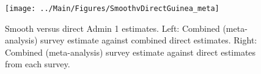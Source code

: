 \documentclass[12pt]{article}\usepackage[]{graphicx}\usepackage[]{color}
\newenvironment{knitrout}{}{} %
\begin{document}



\begin{knitrout}
\color{fgcolor}\begin{figure}[bht]

{\centering \texttt{[image: ../Main/Figures/SmoothvDirectGuinea\_meta]} 

}

\caption[Smooth versus direct Admin 1 estimates]{Smooth versus direct Admin 1 estimates. Left: Combined (meta-analysis) survey estimate against combined direct estimates. Right: Combined (meta-analysis) survey estimate against direct estimates from each survey.}\label{fig:unnamed-chunk-153}
\end{figure}


\end{knitrout}
\end{document}
